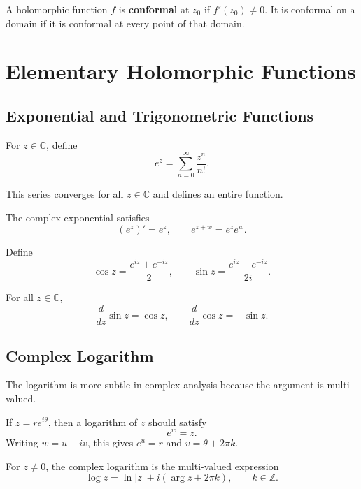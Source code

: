 \begin{definition}
A holomorphic function $f$ is \textbf{conformal} at $z_0$ if $f'(z_0)\neq 0$. It is conformal on a domain if it is conformal at every point of that domain.
\end{definition}

\section{Elementary Holomorphic Functions}

\subsection{Exponential and Trigonometric Functions}

\begin{definition}
For $z\in\mathbb{C}$, define
\[
    e^z=\sum_{n=0}^{\infty}\frac{z^n}{n!}.
\]
\end{definition}

This series converges for all $z\in\mathbb{C}$ and defines an entire function.

\begin{proposition}
The complex exponential satisfies
\[
    (e^z)'=e^z,
    \qquad
    e^{z+w}=e^ze^w.
\]
\end{proposition}

\begin{definition}
Define
\[
    \cos z=\frac{e^{iz}+e^{-iz}}{2},
    \qquad
    \sin z=\frac{e^{iz}-e^{-iz}}{2i}.
\]
\end{definition}

\begin{proposition}
For all $z\in\mathbb{C}$,
\[
    \frac{d}{dz}\sin z=\cos z,
    \qquad
    \frac{d}{dz}\cos z=-\sin z.
\]
\end{proposition}

\subsection{Complex Logarithm}

The logarithm is more subtle in complex analysis because the argument is multi-valued.

If $z=re^{i\theta}$, then a logarithm of $z$ should satisfy
\[
    e^w=z.
\]
Writing $w=u+iv$, this gives $e^u=r$ and $v=\theta+2\pi k$.

\begin{definition}
For $z\neq 0$, the complex logarithm is the multi-valued expression
\[
    \log z=\ln|z|+i(\arg z+2\pi k),\qquad k\in\mathbb{Z}.
\]
\end{definition}

